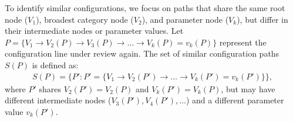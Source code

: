 
 To identify similar configurations, we focus on paths that share the same root node (\(V_1\)), broadest category node (\(V_2\)), and parameter node (\(V_k\)), but differ in their intermediate nodes or parameter values. Let \( P = \{ V_1 \rightarrow V_2(P) \rightarrow V_3(P) \rightarrow \dots \rightarrow V_k(P) = v_k(P) \} \) represent the configuration line under review again.
The set of similar configuration paths \( S(P) \) is defined as:
\begin{multline*}
S(P) = \{ P' : P' = \{ V_1 \rightarrow V_2(P') \rightarrow \dots \rightarrow V_k(P') = v_k(P') \} \},
\end{multline*}
where \( P' \) shares \(V_2(P') = V_2(P)\) and \(V_k(P') = V_k(P)\), but may have different intermediate nodes (\( V_3(P'), V_4(P'), \dots \)) and a different parameter value \( v_k(P') \).

